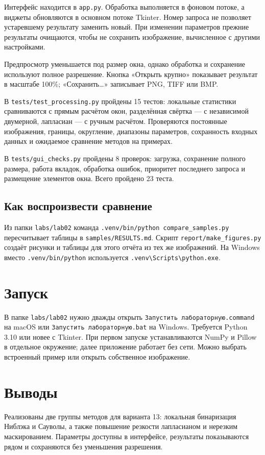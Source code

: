 \documentclass[12pt,a4paper]{extarticle}
\newcommand{\code}[1]{\texttt{\small #1}}
\begin{document}
Интерфейс находится в \code{app.py}. Обработка выполняется в фоновом потоке, а виджеты обновляются в основном потоке Tkinter. Номер запроса не позволяет устаревшему результату заменить новый. При изменении параметров прежние результаты очищаются, чтобы не сохранить изображение, вычисленное с другими настройками.

Предпросмотр уменьшается под размер окна, однако обработка и сохранение используют полное разрешение. Кнопка «Открыть крупно» показывает результат в масштабе 100\%; «Сохранить…» записывает PNG, TIFF или BMP.

В \code{tests/test\_processing.py} пройдены 15 тестов: локальные статистики сравниваются с прямым расчётом окон, разделённая свёртка --- с независимой двумерной, лапласиан --- с ручным расчётом. Проверяются постоянные изображения, границы, округление, диапазоны параметров, сохранность входных данных и ожидаемое сравнение методов на примерах.

В \code{tests/gui\_checks.py} пройдены 8 проверок: загрузка, сохранение полного размера, работа вкладок, обработка ошибок, приоритет последнего запроса и размещение элементов окна. Всего пройдено 23 теста.

\subsection*{Как воспроизвести сравнение}
Из папки \code{labs/lab02} команда \code{.venv/bin/python compare\_samples.py} пересчитывает таблицы в \code{samples/RESULTS.md}. Скрипт \code{report/make\_figures.py} создаёт рисунки и таблицы для этого отчёта из тех же изображений. На Windows вместо \code{.venv/bin/python} используется \code{.venv\textbackslash Scripts\textbackslash python.exe}.

\section{Запуск}
В папке \code{labs/lab02} нужно дважды открыть \texttt{Запустить лабораторную.command} на macOS или \texttt{Запустить лабораторную.bat} на Windows. Требуется Python 3.10 или новее с Tkinter. При первом запуске устанавливаются NumPy и Pillow в отдельное окружение; далее приложение работает без сети. Можно выбрать встроенный пример или открыть собственное изображение.

\clearpage
\section{Выводы}
Реализованы две группы методов для варианта 13: локальная бинаризация Ниблэка и Сауволы, а также повышение резкости лапласианом и нерезким маскированием. Параметры доступны в интерфейсе, результаты показываются рядом и сохраняются без уменьшения разрешения.
\end{document}
